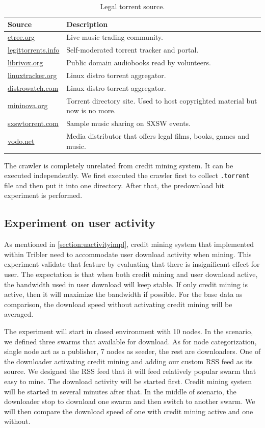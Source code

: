 \begin{table}[h]
	\centering
	\caption{Legal torrent source.}
	\label{tbl:legaltorrentsource}
	\begin{tabular}{lp{9cm}}
		\hline
		Source & Description \\ \hline
		\url{etree.org} & Live music trading community. \\
		\url{legittorrents.info} & Self-moderated torrent tracker and portal. \\
		\url{librivox.org} & Public domain audiobooks read by volunteers. \\
		\url{linuxtracker.org} & Linux distro torrent aggregator. \\
		\url{distrowatch.com} & Linux distro torrent aggregator. \\
		\url{mininova.org} & Torrent directory site. Used to host copyrighted material but now is no more.\\
		\url{sxswtorrent.com} & Sample music sharing on SXSW events. \\
		\url{vodo.net} & Media distributor that offers legal films, books, games and music.

	\end{tabular}
\end{table}

The crawler is completely unrelated from credit mining system. It can be executed independently. We first executed the crawler first to collect \texttt{.torrent} file and then put it into one directory. After that, the predownload hit experiment is performed.

\subsection{Experiment on user activity}
As mentioned in \ref{section:uactivityimpl}, credit mining system that implemented within Tribler need to accommodate user download activity when mining. This experiment validate that feature by evaluating that there is insignificant effect for user. The expectation is that when both credit mining and user download active, the bandwidth used in user download will keep stable. If only credit mining is active, then it will maximize the bandwidth if possible. For the base data as comparison, the download speed without activating credit mining will be averaged.

The experiment will start in closed environment with 10 nodes. In the scenario, we defined three swarms that available for download. As for node categorization, single node act as a publisher, 7 nodes as seeder, the rest are downloaders. One of the downloader activating credit mining and adding our custom RSS feed as its source. We designed the RSS feed that it will feed relatively popular swarm that easy to mine. The download activity will be started first. Credit mining system will be started in several minutes after that. In the middle of scenario, the downloader stop to download one swarm and then switch to another swarm. We will then compare the download speed of one with credit mining active and one without. 

